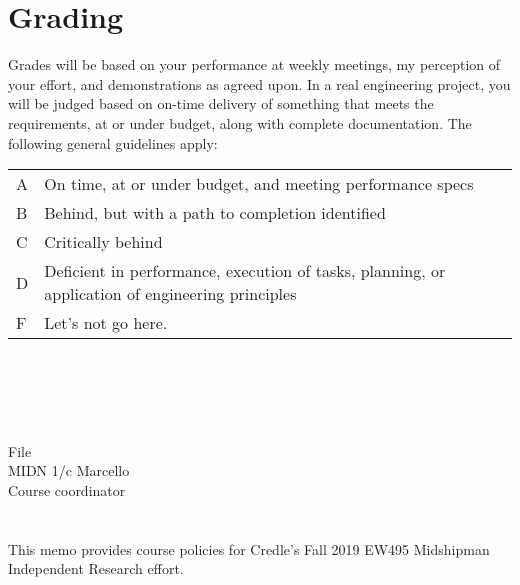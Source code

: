\documentclass[10pt,courier]{navymemo}
\begin{document}
\section{Grading}
Grades will be based on your performance at weekly meetings, my perception of your effort, and demonstrations as agreed upon.  In a
\clearpage\noindent real engineering project, you will be judged based on on-time delivery of something that meets the requirements, at or under budget, along with complete documentation. The following general guidelines apply: 
\begin{center}
\begin{tabular}{lp{5in}}
A & On time, at or under budget, and meeting performance specs \\
B & Behind, but with a path to completion identified \\
C & Critically behind \\
D & Deficient in performance, execution of tasks, planning, or application of engineering principles \\
F & Let's not go here. \\
\end{tabular}
\end{center}

\noclosing{}\\
\noindent\hspace*{4in}
\signature{D Evangelista}

\noindent\hspace*{4in}{207 Maury Hall}\\
\hspace*{4in}{(410) 293-6132}\\

\copyto{}
File\\
MIDN 1/c Marcello\\
Course coordinator


\navyrecordnote
\thispagestyle{empty}


\navyrecordnotesubjline

\section{} This memo provides course policies for Credle's Fall 2019 EW495 Midshipman Independent Research effort.
\end{document}

